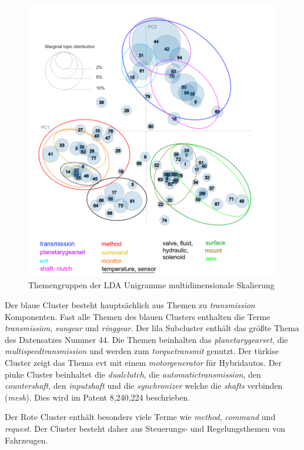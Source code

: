  \begin{figure}[htpb]
 	\centering
 	\includegraphics[width=\textwidth,keepaspectratio=true]{img/LDAvisGM-3-1-1_clustered.png}
 	\caption{
 		Themengruppen der LDA Unigramme multidimensionale Skalierung
 	}
 	\label{fig:Themengruppen_LDA_Unigramm}
 \end{figure}
 
 
Der blaue Cluster besteht hauptsächlich aus Themen zu \emph{transmission} Komponenten. Fast alle Themen des blauen Clusters enthalten die Terme \emph{transmission}, \emph{sungear} und \emph{ringgear}. Der lila Subcluster enthält das größte Thema des Datensatzes Nummer 44. Die Themen beinhalten das \emph{planetarygearset}, die \emph{multispeedtransmission} und werden zum \emph{torquetransmit} genutzt. Der türkise Cluster zeigt das Thema \gls{evt} mit einem \emph{motorgenerator} für Hybridautos. Der pinke Cluster beinhaltet die \emph{dualclutch}, die  \emph{automatictransmission}, den \emph{countershaft}, den \emph{inputshaft} und die \emph{synchronizer} welche die \emph{shafts} verbinden (\emph{mesh}). Dies wird im Patent 8,240,224 beschrieben.
 
Der Rote Cluster enthält besonders viele Terme wie \emph{method}, \emph{command} und \emph{request}. Der Cluster besteht daher aus Steuerungs- und Regelungsthemen von Fahrzeugen.
 
